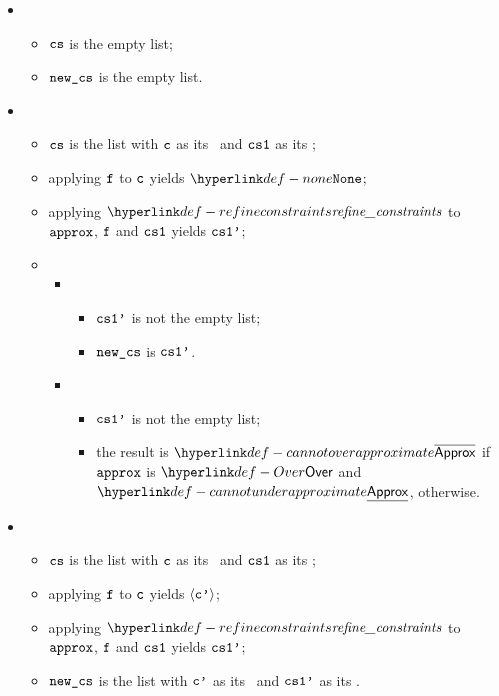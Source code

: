 \ProseParagraph
\OneApplies
\begin{itemize}
  \item {}
  \begin{itemize}
    \item $\texttt{cs}$ is the empty list;
    \item $\texttt{new\_cs}$ is the empty list.
  \end{itemize}

  \item \AllApply
  \begin{itemize}
    \item $\texttt{cs}$ is the list with $\texttt{c}$ as its \head\ and $\texttt{cs1}$ as its \tail;
    \item applying $\texttt{f}$ to $\texttt{c}$ yields $\None$;
    \item applying $\refineconstraints$ to $\texttt{approx}$, $\texttt{f}$ and $\texttt{cs1}$ yields $\texttt{cs1'}$;
    \item \OneApplies
    \begin{itemize}
      \item {}
      \begin{itemize}
        \item $\texttt{cs1'}$ is not the empty list;
        \item $\texttt{new\_cs}$ is $\texttt{cs1'}$.
      \end{itemize}

      \item {}
      \begin{itemize}
        \item $\texttt{cs1'}$ is not the empty list;
        \item the result is $\CannotOverapproximate$ if $\texttt{approx}$ is $\Over$ and $\CannotUnderapproximate$, otherwise.
      \end{itemize}
    \end{itemize}
  \end{itemize}

  \item {}
  \begin{itemize}
    \item $\texttt{cs}$ is the list with $\texttt{c}$ as its \head\ and $\texttt{cs1}$ as its \tail;
    \item applying $\texttt{f}$ to $\texttt{c}$ yields $\langle\texttt{c'}\rangle$;
    \item applying $\refineconstraints$ to $\texttt{approx}$, $\texttt{f}$ and $\texttt{cs1}$ yields $\texttt{cs1'}$;
    \item $\texttt{new\_cs}$ is the list with $\texttt{c'}$ as its \head\ and $\texttt{cs1'}$ as its \tail.
  \end{itemize}
\end{itemize}

